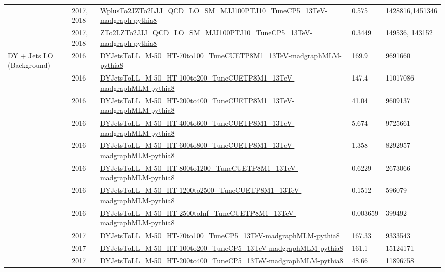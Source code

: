 \begin{table}
{\begin{tabular}{lllll}
              & 2017, 2018 & \url{WplusTo2JZTo2LJJ_QCD_LO_SM_MJJ100PTJ10_TuneCP5_13TeV-madgraph-pythia8}               & 0.575              & 1428816,1451346  \\
              & 2017, 2018 & \url{ZTo2LZTo2JJJ_QCD_LO_SM_MJJ100PTJ10_TuneCP5_13TeV-madgraph-pythia8}                   & 0.3449             & 149536, 143152   \\
      \midrule
      \midrule
      \multirow{16}{1.1in}{
        DY + Jets LO (Background)}
              & 2016       & \url{DYJetsToLL_M-50_HT-70to100_TuneCUETP8M1_13TeV-madgraphMLM-pythia8}                   & 169.9              & 9691660          \\
              & 2016       & \url{DYJetsToLL_M-50_HT-100to200_TuneCUETP8M1_13TeV-madgraphMLM-pythia8}                  & 147.4              & 11017086         \\
              & 2016       & \url{DYJetsToLL_M-50_HT-200to400_TuneCUETP8M1_13TeV-madgraphMLM-pythia8}                  & 41.04              & 9609137          \\
              & 2016       & \url{DYJetsToLL_M-50_HT-400to600_TuneCUETP8M1_13TeV-madgraphMLM-pythia8}                  & 5.674              & 9725661          \\
              & 2016       & \url{DYJetsToLL_M-50_HT-600to800_TuneCUETP8M1_13TeV-madgraphMLM-pythia8}                  & 1.358              & 8292957          \\
              & 2016       & \url{DYJetsToLL_M-50_HT-800to1200_TuneCUETP8M1_13TeV-madgraphMLM-pythia8}                 & 0.6229             & 2673066          \\
              & 2016       & \url{DYJetsToLL_M-50_HT-1200to2500_TuneCUETP8M1_13TeV-madgraphMLM-pythia8}                & 0.1512             & 596079           \\
              & 2016       & \url{DYJetsToLL_M-50_HT-2500toInf_TuneCUETP8M1_13TeV-madgraphMLM-pythia8}                 & 0.003659           & 399492           \\
      \cmidrule(lr){2-5}
              & 2017       & \url{DYJetsToLL_M-50_HT-70to100_TuneCP5_13TeV-madgraphMLM-pythia8}                        & 167.33             & 9333543          \\
              & 2017       & \url{DYJetsToLL_M-50_HT-100to200_TuneCP5_13TeV-madgraphMLM-pythia8}                       & 161.1              & 15124171         \\
              & 2017       & \url{DYJetsToLL_M-50_HT-200to400_TuneCP5_13TeV-madgraphMLM-pythia8}                       & 48.66              & 11896758         \\

\end{tabular}}
\end{table}
